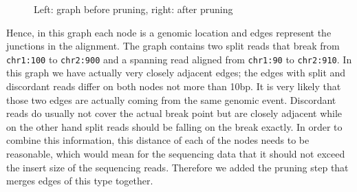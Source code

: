 \documentclass{article}
\theoremstyle{definition}
\begin{document}
\begin{figure*}
\caption{Left: graph before pruning, right: after pruning}
\label{fig:pruning_graph}
\end{figure*}

Hence, in this graph each node is a genomic location and edges represent the junctions in the alignment.
The graph contains two split reads that break from \verb|chr1:100| to \verb|chr2:900| and a spanning read aligned from \verb|chr1:90| to \verb|chr2:910|.
In this graph we have actually very closely adjacent edges; the edges with split and discordant reads differ on both nodes not more than 10bp.
It is very likely that those two edges are actually coming from the same genomic event.
Discordant reads do usually not cover the actual break point but are closely adjacent while on the other hand split reads should be falling on the break exactly.
In order to combine this information, this distance of each of the nodes needs to be reasonable, which would mean for the sequencing data that it should not exceed the insert size of the sequencing reads.
Therefore we added the pruning step that merges edges of this type together.
\end{document}

